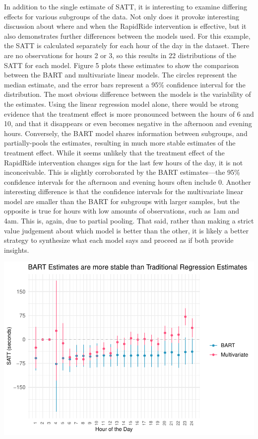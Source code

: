 \documentclass[
  12pt,
]{article}
\begin{document}
In addition to the single estimate of SATT, it is interesting to examine
differing effects for various subgroups of the data. Not only does it
provoke interesting discussion about where and when the RapidRide
intervention is effective, but it also demonstrates further differences
between the models used. For this example, the SATT is calculated
separately for each hour of the day in the dataset. There are no
observations for hours 2 or 3, so this results in 22 distributions of
the SATT for each model. Figure 5 plots these estimates to show the
comparison between the BART and multivariate linear models. The circles
represent the median estimate, and the error bars represent a 95\%
confidence interval for the distribution. The most obvious difference
between the models is the variability of the estimates. Using the linear
regression model alone, there would be strong evidence that the
treatment effect is more pronounced between the hours of 6 and 10, and
that it disappears or even becomes negative in the afternoon and evening
hours. Conversely, the BART model shares information between subgroups,
and partially-pools the estimates, resulting in much more stable
estimates of the treatment effect. While it seems unlikely that the
treatment effect of the RapidRide intervention changes sign for the last
few hours of the day, it is not inconceivable. This is slightly
corroborated by the BART estimates---the 95\% confidence intervals for
the afternoon and evening hours often include 0. Another interesting
difference is that the confidence intervals for the multivariate linear
model are smaller than the BART for subgroups with larger samples, but
the opposite is true for hours with low amounts of observations, such as
1am and 4am. This is, again, due to partial pooling. That said, rather
than making a strict value judgement about which model is better than
the other, it is likely a better strategy to synthesize what each model
says and proceed as if both provide insights.

\includegraphics{thesis-draft-1_files/figure-latex/unnamed-chunk-16-1.pdf}
\end{document}
